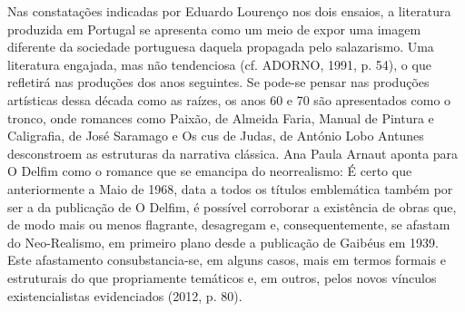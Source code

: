 \documentclass[../DISSERTACAO_MAIN.tex]{subfiles}
\begin{document}
Nas constatações indicadas por Eduardo Lourenço nos dois ensaios, a literatura produzida em Portugal se apresenta como um meio de expor uma imagem diferente da sociedade portuguesa daquela propagada pelo salazarismo. Uma literatura engajada, mas não tendenciosa (cf. ADORNO, 1991, p. 54), o que refletirá nas produções dos anos seguintes. Se pode-se pensar nas produções artísticas dessa década como as raízes, os anos 60 e 70 são apresentados como o tronco, onde romances como Paixão, de Almeida Faria, Manual de Pintura e Caligrafia, de José Saramago e Os cus de Judas, de António Lobo Antunes desconstroem as estruturas da narrativa clássica. Ana Paula Arnaut aponta para O Delfim como o romance que se emancipa do neorrealismo:
É certo que anteriormente a Maio de 1968, data a todos os títulos emblemática também por ser  a da publicação de O Delfim, é possível corroborar a existência de obras que, de modo mais ou menos flagrante, desagregam e, consequentemente, se afastam  do Neo-Realismo, em primeiro plano desde a publicação de Gaibéus em 1939. Este afastamento consubstancia-se, em alguns casos, mais em termos formais e estruturais do que propriamente temáticos e, em outros, pelos novos vínculos existencialistas evidenciados (2012, p. 80).
\end{document}
